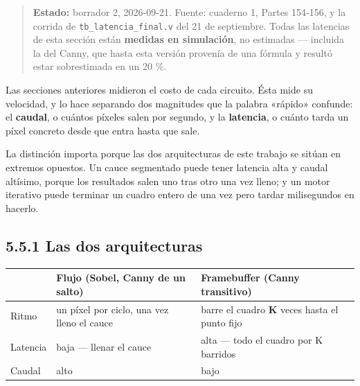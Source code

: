 \begin{quote}
\textbf{Estado:} borrador 2, 2026-09-21. Fuente: cuaderno 1, Partes
154-156, y la corrida de \texttt{tb\_latencia\_final.v} del 21 de
septiembre. Todas las latencias de esta sección están \textbf{medidas en
simulación}, no estimadas --- incluida la del Canny, que hasta esta
versión provenía de una fórmula y resultó estar sobrestimada en un 20
\%.
\end{quote}

Las secciones anteriores midieron el costo de cada circuito. Ésta mide
su velocidad, y lo hace separando dos magnitudes que la palabra «rápido»
confunde: el \textbf{caudal}, o cuántos píxeles salen por segundo, y la
\textbf{latencia}, o cuánto tarda un píxel concreto desde que entra
hasta que sale.

La distinción importa porque las dos arquitecturas de este trabajo se
sitúan en extremos opuestos. Un cauce segmentado puede tener latencia
alta y caudal altísimo, porque los resultados salen uno tras otro una
vez lleno; y un motor iterativo puede terminar un cuadro entero de una
vez pero tardar milisegundos en hacerlo.

\subsection{5.5.1 Las dos arquitecturas}\label{las-dos-arquitecturas}

\begin{longtable}[]{@{}
  >{\raggedright\arraybackslash}p{}
  >{\raggedright\arraybackslash}p{}
  >{\raggedright\arraybackslash}p{}@{}}
\toprule\noalign{}
\begin{minipage}[b]{\linewidth}\raggedright
\end{minipage} & \begin{minipage}[b]{\linewidth}\raggedright
Flujo (Sobel, Canny de un salto)
\end{minipage} & \begin{minipage}[b]{\linewidth}\raggedright
Framebuffer (Canny transitivo)
\end{minipage} \\
\midrule\noalign{}
\endhead
\bottomrule\noalign{}
\endlastfoot
Ritmo & un píxel por ciclo, una vez lleno el cauce & barre el cuadro
\textbf{K} veces hasta el punto fijo \\
Latencia & baja --- llenar el cauce & alta --- todo el cuadro por K
barridos \\
Caudal & alto & bajo \\
\end{longtable}

